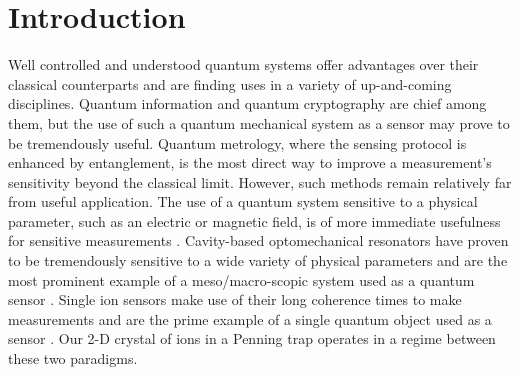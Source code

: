 \documentclass[aps,prl,twocolumn,superscriptaddress,floatfix]{revtex4-1}
\begin{document}


\section{Introduction}
Well controlled and understood quantum systems offer advantages over their classical counterparts and are finding uses in a variety of up-and-coming disciplines. Quantum information and quantum cryptography are chief among them, but the use of such a quantum mechanical system as a sensor may prove to be tremendously useful. Quantum metrology, where the sensing protocol is enhanced by entanglement, is the most direct way to improve a measurement's sensitivity beyond the classical limit. However, such methods remain relatively far from useful application. The use of a quantum system sensitive to a physical parameter, such as an electric or magnetic field, is of more immediate usefulness for sensitive measurements \citep{Degen2016}. Cavity-based optomechanical resonators have proven to be tremendously sensitive to a wide variety of physical parameters and are the most prominent example of a meso/macro-scopic system used as a quantum sensor \citep{Clark2016,Kampel2016,Kim2016a,Schreppler2014a}. Single ion sensors make use of their long coherence times to make measurements and are the prime example of a single quantum object used as a sensor \citep{Shaniv2016,Ivanov2016a,Knunz2010}. Our 2-D crystal of ions in a Penning trap operates in a regime between these two paradigms.
 
\end{document}
